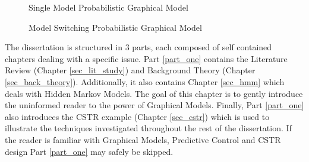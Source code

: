 \begin{figure}[H]
 \centering
\begin{minipage}[b]{0.45\textwidth}
 \centering
{}
\caption{Single Model Probabilistic Graphical Model}
\label{fig_linear}
\end{minipage}\hfill
\begin{minipage}[b]{0.45\textwidth}
 \centering
{}
\caption{Model Switching Probabilistic Graphical Model}
\label{fig_switch_linear}
\end{minipage}
\end{figure}
The dissertation is structured in 3 parts, each composed of self contained chapters dealing with a specific issue. Part \ref{part_one} contains the Literature Review (Chapter \ref{sec_lit_study}) and Background Theory (Chapter \ref{sec_back_theory}). Additionally, it also contains Chapter \ref{sec_hmm} which deals with Hidden Markov Models. The goal of this chapter is to gently introduce the uninformed reader to the power of Graphical Models. Finally, Part \ref{part_one} also introduces the CSTR example (Chapter \ref{sec_cstr}) which is used to illustrate the techniques investigated throughout the rest of the dissertation. If the reader is familiar with Graphical Models, Predictive Control and CSTR design Part \ref{part_one} may safely be skipped.

